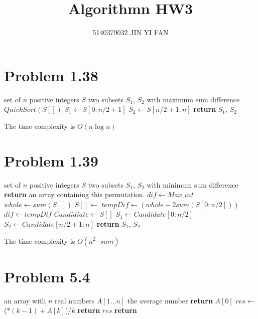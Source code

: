 \documentclass[a4paper]{article}
\title{\textbf{Algorithmn HW3}}
\author{5140379032 JIN YI FAN}
\date{}
\begin{document}
\maketitle
\begin{spacing}{1.3}

\section*{Problem 1.38}
\begin{algorithmic}[1]
\Require set of $n$ positive integers $S$ 
\Ensure two subsets $S_1$, $S_2$ with maximum sum difference
\State $QuickSort(S[])$
\State $S_1 \gets S[0:n/2+1]$
\State $S_2 \gets S[n/2+1:n]$
\State \textbf{return} $S_1$, $S_2$
\end{algorithmic}
The time complexity is $O(n\log n)$

\section*{Problem 1.39}
\begin{algorithmic}[1]
\Require set of $n$ positive integers $S$ 
\Ensure two subsets $S_1$, $S_2$ with minimum sum difference
\State \textbf{return} an array containing this permutation.
\EndFunction
\State $dif\gets Max\_int$
\State $whole \gets sum(S[])$
\State $S[]\gets$ 
\State $tempDif\gets (whole-2sum(S[0:n/2]))$
\State $dif\gets tempDif$
\State $Candidiate\gets S[]$
\EndIf
\EndWhile
\State $S_1 \gets Candidate[0:n/2]$
\State $S_2 \gets Candidate[n/2+1:n]$
\State \textbf{return} $S_1$, $S_2$
\end{algorithmic}
The time complexity is $O(n^2\cdot sum)$

\section*{Problem 5.4}
\begin{algorithmic}[1]
\Require an array with $n$ real numbers $A[1\ldots n]$ 
\Ensure the average number 
\State \textbf{return} $A[0]$
\Else
\State $res\gets$ ($*(k-1)+A[k]$)/$k$
\State \textbf{return} $res$
\EndIf
\EndFunction
\State \textbf{return} 
\end{algorithmic}


\end{spacing}
\end{document}
